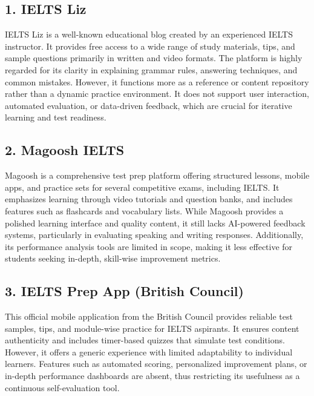 \documentclass[a4paper,12pt]{article}
\begin{document}
\vspace{0.5cm}

\subsection*{1. IELTS Liz}
IELTS Liz is a well-known educational blog created by an experienced IELTS instructor. It provides free access to a wide range of study materials, tips, and sample questions primarily in written and video formats. The platform is highly regarded for its clarity in explaining grammar rules, answering techniques, and common mistakes. However, it functions more as a reference or content repository rather than a dynamic practice environment. It does not support user interaction, automated evaluation, or data-driven feedback, which are crucial for iterative learning and test readiness.

\vspace{0.3cm}

\subsection*{2. Magoosh IELTS}
Magoosh is a comprehensive test prep platform offering structured lessons, mobile apps, and practice sets for several competitive exams, including IELTS. It emphasizes learning through video tutorials and question banks, and includes features such as flashcards and vocabulary lists. While Magoosh provides a polished learning interface and quality content, it still lacks AI-powered feedback systems, particularly in evaluating speaking and writing responses. Additionally, its performance analysis tools are limited in scope, making it less effective for students seeking in-depth, skill-wise improvement metrics.

\vspace{0.3cm}

\subsection*{3. IELTS Prep App (British Council)}
This official mobile application from the British Council provides reliable test samples, tips, and module-wise practice for IELTS aspirants. It ensures content authenticity and includes timer-based quizzes that simulate test conditions. However, it offers a generic experience with limited adaptability to individual learners. Features such as automated scoring, personalized improvement plans, or in-depth performance dashboards are absent, thus restricting its usefulness as a continuous self-evaluation tool.
\end{document}
